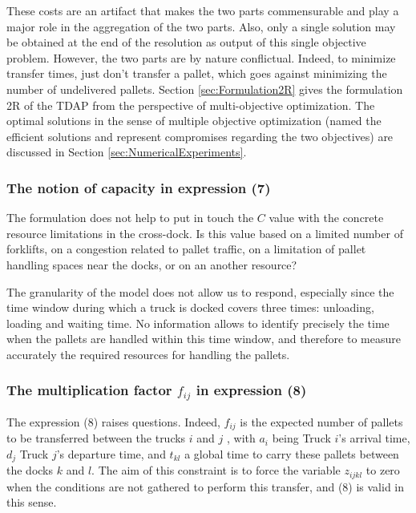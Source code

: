 \documentclass[preprint,12pt,authoryear]{elsarticle}
\begin{document}
These costs are an artifact that makes the two parts commensurable and play a major role in the aggregation of the two parts. Also, only a single solution may be obtained at the end of the resolution as output of this single objective problem. 
%
However, the two parts are by nature conflictual. Indeed, to minimize transfer times, just don't transfer a pallet, which goes against minimizing the number of undelivered pallets. 
%
Section \ref{sec:Formulation2R} gives the formulation 2R of the TDAP from the perspective of multi-objective optimization. The optimal solutions in the sense of multiple objective optimization (named the efficient solutions and represent compromises regarding the two objectives) are discussed in Section \ref{sec:NumericalExperiments}.

%
%
\subsubsection{The notion of capacity in expression (7)}

The formulation does not help to put in touch the $C$ value with the concrete resource limitations in the cross-dock. Is this value based on a limited number of forklifts, on a congestion related to pallet traffic, on a limitation of pallet handling spaces near the docks, or on an another resource? 

The granularity of the model does not allow us to respond, especially since the time window during which a truck is docked covers three times: unloading, loading and waiting time. No information allows to identify precisely the time  when the pallets are handled within this time window, and therefore to measure accurately the required resources for handling the pallets.

%
%
\subsubsection{The multiplication factor $f_{ij}$ in expression (8)}

The expression (8) raises questions.
%
Indeed, $f_{ij}$ is the expected number of pallets to be transferred between the trucks $i$ and $j$ , with $a_i$ being Truck $i$'s arrival time, $d_j$ Truck $j$'s departure time, and $t_{kl}$ a global time to carry these pallets between the docks $k$ and $l$. 
%
The aim of this constraint is to force the variable $z_{ijkl}$ to zero when the conditions are not gathered to perform this transfer, and (8) is valid in this sense.
\end{document}
